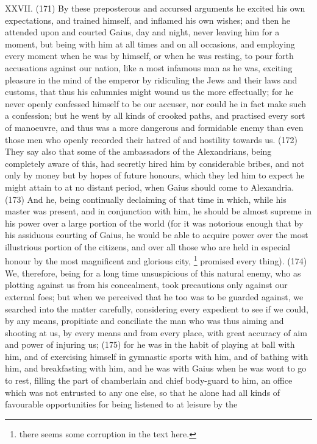 XXVII. (171) By these preposterous and accursed arguments he excited his own expectations,
and trained himself, and inflamed his own wishes; and then he attended upon and courted Gaius,
day and night, never leaving him for a moment, but being with him at all times and on all occasions,
and employing every moment when he was by himself, or when he was resting, to pour forth
accusations against our nation, like a most infamous man as he was, exciting pleasure in the mind
of the emperor by ridiculing the Jews and their laws and customs, that thus his calumnies might
wound us the more effectually; for he never openly confessed himself to be our accuser, nor could
he in fact make such a confession; but he went by all kinds of crooked paths, and practised every
sort of manoeuvre, and thus was a more dangerous and formidable enemy than even those men
who openly recorded their hatred of and hostility towards us. (172) They say also that some of the
ambassadors of the Alexandrians, being completely aware of this, had secretly hired him by
considerable bribes, and not only by money but by hopes of future honours, which they led him to
expect he might attain to at no distant period, when Gaius should come to Alexandria. (173) And
he, being continually declaiming of that time in which, while his master was present, and in
conjunction with him, he should be almost supreme in his power over a large portion of the world
(for it was notorious enough that by his assiduous courting of Gaius, he would be able to acquire
power over the most illustrious portion of the citizens, and over all those who are held in especial
honour by the most magnificent and glorious city, \footnote{there seems some corruption in the text here.}
promised every thing). (174) We, therefore, being for a long time unsuspicious of this natural
enemy, who as plotting against us from his concealment, took precautions only against our
external foes; but when we perceived that he too was to be guarded against, we searched into the
matter carefully, considering every expedient to see if we could, by any means, propitiate and
conciliate the man who was thus aiming and shooting at us, by every means and from every place,
with great accuracy of aim and power of injuring us; (175) for he was in the habit of playing at ball
with him, and of exercising himself in gymnastic sports with him, and of bathing with him, and
breakfasting with him, and he was with Gaius when he was wont to go to rest, filling the part of
chamberlain and chief body-guard to him, an office which was not entrusted to any one else, so
that he alone had all kinds of favourable opportunities for being listened to at leisure by the
